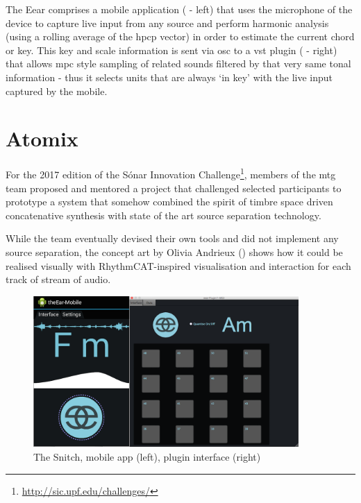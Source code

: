 The Eear comprises a mobile application ( - left) that uses the microphone of the device to capture live input from any source and perform harmonic analysis (using a rolling average of the \acrshort{hpcp} vector) in order to estimate the current chord or key. This key and scale information is sent via \acrshort{osc} to a \acrshort{vst} plugin ( - right) that allows \acrshort{mpc} style sampling of related sounds filtered by that very same tonal information - thus it selects units that are always `in key' with the live input captured by the mobile.

\section{Atomix}

For the 2017 edition of the Sónar Innovation Challenge\footnote{\url{http://sic.upf.edu/challenges/}}, members of the \acrshort{mtg} team proposed and mentored a project that challenged selected participants to prototype a system that somehow combined the spirit of timbre space driven concatenative synthesis with state of the art source separation technology.

While the team eventually devised their own tools and did not implement any source separation, the concept art by Olivia Andrieux () shows how it could be realised visually with RhythmCAT-inspired visualisation and interaction for each track of stream of audio.

\begin{figure}
	\begin{center}
		\includegraphics[width=0.9\textwidth]{ch99/figures/combined.png}
	\end{center}
	\caption[The Snitch Enhanced DJ Assistant mobile and plugin interface]{The Snitch, mobile app (left), plugin interface (right)}
	\label{fig:eear}
\end{figure}

